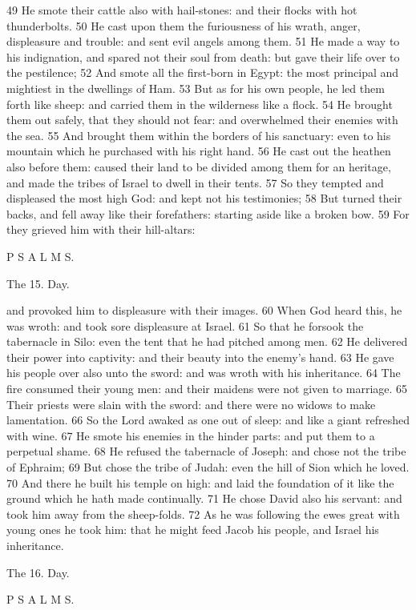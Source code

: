 49 He smote their cattle also with hail-stones: and their flocks with hot thunderbolts. 50 He cast upon them the furiousness of his wrath, anger, displeasure and trouble: and sent evil angels among them. 51 He made a way to his indignation, and spared not their soul from death: but gave their life over to the pestilence; 52 And smote all the first-born in Egypt: the most principal and mightiest in the dwellings of Ham. 53 But as for his own people, he led them forth like sheep: and carried them in the wilderness like a flock. 54 He brought them out safely, that they should not fear: and overwhelmed their enemies with the sea. 55 And brought them within the borders of his sanctuary: even to his mountain which he purchased with his right hand. 56 He cast out the heathen also before them: caused their land to be divided among them for an heritage, and made the tribes of Israel to dwell in their tents. 57 So they tempted and displeased the most high God: and kept not his testimonies; 58 But turned their backs, and fell away like their forefathers: starting aside like a broken bow. 59 For they grieved him with their hill-altars:

P S A L M S.

The 15. Day.

and provoked him to displeasure with their images. 60 When God heard this, he was wroth: and took sore displeasure at Israel. 61 So that he forsook the tabernacle in Silo: even the tent that he had pitched among men. 62 He delivered their power into captivity: and their beauty into the enemy's hand. 63 He gave his people over also unto the sword: and was wroth with his inheritance. 64 The fire consumed their young men: and their maidens were not given to marriage. 65 Their priests were slain with the sword: and there were no widows to make lamentation. 66 So the Lord awaked as one out of sleep: and like a giant refreshed with wine. 67 He smote his enemies in the hinder parts: and put them to a perpetual shame. 68 He refused the tabernacle of Joseph: and chose not the tribe of Ephraim; 69 But chose the tribe of Judah: even the hill of Sion which he loved. 70 And there he built his temple on high: and laid the foundation of it like the ground which he hath made continually. 71 He chose David also his servant: and took him away from the sheep-folds. 72 As he was following the ewes great with young ones he took him: that he might feed Jacob his people, and Israel his inheritance.

The 16. Day.

P S A L M S.

